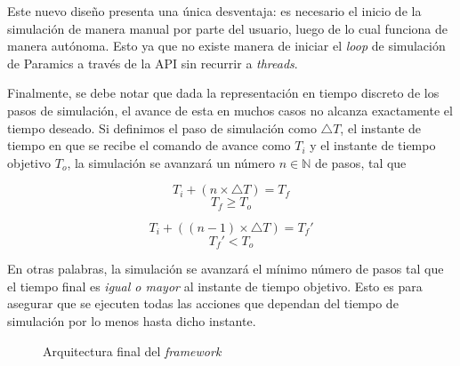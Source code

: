 Este nuevo diseño presenta una única desventaja: es necesario el inicio de la simulación de manera manual por parte del usuario, luego de lo cual funciona de manera autónoma. Esto ya que no existe manera de iniciar el \emph{loop} de simulación de Paramics a través de la API sin recurrir a \emph{threads}.

Finalmente, se debe notar que dada la representación en tiempo discreto de los pasos de simulación, el avance de esta en muchos casos no alcanza exactamente el tiempo deseado. Si definimos el paso de simulación como $\triangle T$, el instante de tiempo en que se recibe el comando de avance como $T_{i}$ y el instante de tiempo objetivo $T_{o}$, la simulación se avanzará un número $n \in \mathbb{N}$ de pasos, tal que

\begin{multicols}{2}
    \[ T_{i} + (n \times \triangle T) = T_{f} \]
    \[ T_{f} \geq T_{o} \]
    
    \[ T_{i} + ((n - 1) \times \triangle T) = T_{f}' \]
    \[ T_{f}' < T_{o} \]
\end{multicols}

En otras palabras, la simulación se avanzará el mínimo número de pasos tal que el tiempo final es \emph{igual o mayor} al instante de tiempo objetivo. Esto es para asegurar que se ejecuten todas las acciones que dependan del tiempo de simulación por lo menos hasta dicho instante.

\begin{figure}[htpb]
    \centering
    
    \caption{Arquitectura final del \emph{framework}}
    \label{fig:ptraci_arch2}
\end{figure}